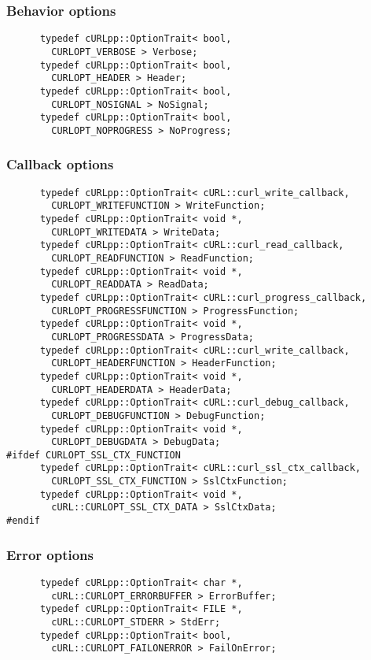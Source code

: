 \documentclass{article}
\begin{document}
\subsubsection{Behavior options}
\begin{verbatim}
      typedef cURLpp::OptionTrait< bool, 
        CURLOPT_VERBOSE > Verbose;
      typedef cURLpp::OptionTrait< bool, 
        CURLOPT_HEADER > Header;
      typedef cURLpp::OptionTrait< bool, 
        CURLOPT_NOSIGNAL > NoSignal;
      typedef cURLpp::OptionTrait< bool, 
        CURLOPT_NOPROGRESS > NoProgress;
\end{verbatim}

\subsubsection{Callback options}
\begin{verbatim}
      typedef cURLpp::OptionTrait< cURL::curl_write_callback,
        CURLOPT_WRITEFUNCTION > WriteFunction;
      typedef cURLpp::OptionTrait< void *, 
        CURLOPT_WRITEDATA > WriteData;
      typedef cURLpp::OptionTrait< cURL::curl_read_callback, 
        CURLOPT_READFUNCTION > ReadFunction;
      typedef cURLpp::OptionTrait< void *, 
        CURLOPT_READDATA > ReadData;
      typedef cURLpp::OptionTrait< cURL::curl_progress_callback, 
        CURLOPT_PROGRESSFUNCTION > ProgressFunction;
      typedef cURLpp::OptionTrait< void *, 
        CURLOPT_PROGRESSDATA > ProgressData;
      typedef cURLpp::OptionTrait< cURL::curl_write_callback, 
        CURLOPT_HEADERFUNCTION > HeaderFunction;
      typedef cURLpp::OptionTrait< void *, 
        CURLOPT_HEADERDATA > HeaderData;
      typedef cURLpp::OptionTrait< cURL::curl_debug_callback, 
        CURLOPT_DEBUGFUNCTION > DebugFunction;
      typedef cURLpp::OptionTrait< void *, 
        CURLOPT_DEBUGDATA > DebugData;
#ifdef CURLOPT_SSL_CTX_FUNCTION
      typedef cURLpp::OptionTrait< cURL::curl_ssl_ctx_callback, 
        CURLOPT_SSL_CTX_FUNCTION > SslCtxFunction;
      typedef cURLpp::OptionTrait< void *, 
        cURL::CURLOPT_SSL_CTX_DATA > SslCtxData;
#endif
\end{verbatim}

\subsubsection{Error options}
\begin{verbatim}
      typedef cURLpp::OptionTrait< char *, 
        cURL::CURLOPT_ERRORBUFFER > ErrorBuffer;
      typedef cURLpp::OptionTrait< FILE *, 
        cURL::CURLOPT_STDERR > StdErr;
      typedef cURLpp::OptionTrait< bool, 
        cURL::CURLOPT_FAILONERROR > FailOnError;
\end{verbatim}
\end{document}
